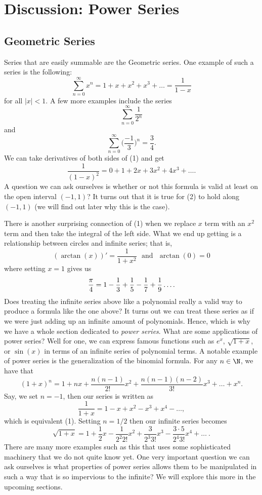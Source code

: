 \section{Discussion: Power Series}

\subsection{Geometric Series}

Series that are easily summable are the Geometric series. One example of such a series is the following:
\[  \sum_{ n=0 }^{ \infty  } x^n = 1 + x + x^2 + x^3 + \dots = \frac{ 1 }{ 1 -x  } \tag{1} \]
for all \( | x  | < 1  \). A few more examples include the series 
\[  \sum_{ n=0  }^{ \infty  } \frac{ 1 }{ 2^n }  \] and 
\[  \sum_{ n=0  }^{ \infty  } \Big( \frac{ -1 }{ 3 }  \Big)^n = \frac{ 3 }{ 4 }. \]
We can take derivatives of both sides of (1) and get 
\[  \frac{ 1 }{ (1-x)^2 } = 0 + 1 + 2x + 3x^2 + 4x^3 + \dots. \tag{2} \]
A question we can ask ourselves is whether or not this formula is valid at least on the open interval \( (-1,1) \)? It turns out that it is true for (2) to hold along \( (-1,1) \) (we will find out later why this is the case).  


There is another surprising connection of (1) when we replace \( x  \) term with an \( x^2 \) term and then take the integral of the left side. What we end up getting is a relationship between circles and infinite series; that is, 
\[ (\arctan(x))' = \frac{ 1 }{ 1 + x^2  } \text{~ and ~} \arctan(0) = 0 \]
where setting \( x = 1  \) gives us 
\[ \frac{ \pi  }{ 4  } = 1 - \frac{ 1 }{ 3 } + \frac{ 1 }{ 5 } - \frac{ 1 }{ 7 }  + \frac{ 1 }{ 9 } \- \dots .  \]
Does treating the infinite series above like a polynomial really a valid way to produce a formula like the one above? It turns out we can treat these series as if we were just adding up an infinite amount of polynomials. Hence, which is why we have a whole section dedicated to \textit{power series}. What are some applications of power series? Well for one, we can express famous functions such as \( e^x  \), \( \sqrt{ 1 + x  }  \), or \( \sin(x)   \) in terms of an infinite series of polynomial terms. 
A notable example of power series is the generalization of the binomial formula. For any \( n \in \N  \), we have that 
\[  (1+x)^n  = 1 + nx + \frac{ n(n-1) }{ 2! } x^2 + \frac{ n(n-1) (n-2) }{ 3! } x^3 + \dots + x^n.\]
Say, we set \( n = -1  \), then our series is written as 
\[  \frac{ 1 }{ 1+x  } = 1 - x + x^2 - x^3 + x^4 - \dots, \]
which is equivalent (1). Setting \( n = 1/2 \) then our infinite series becomes
\[ \sqrt{ 1 + x  } = 1 + \frac{ 1 }{ 2 } x - \frac{ 1 }{ 2^2 2! } x^2 + \frac{ 3 }{ 2^3 3! } x^3 - \frac{ 3 \cdot 5  }{ 2^4 3! } x^4 + \dots ~ .  \] There are many more examples such as this that uses some sophisticated machinery that we do not quite know yet. One very important question we can ask ourselves is what properties of power series allows them to be manipulated in such a way that is so impervious to the infinite? We will explore this more in the upcoming sections.





